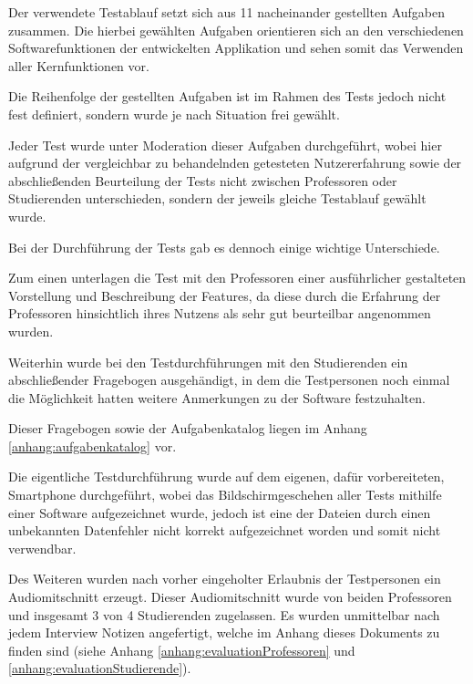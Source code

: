 \documentclass[bibliography=totoc,listof=totoc,BCOR=5mm,DIV=12,oneside]{scrbook}
\begin{document}
{\par \bigskip Der verwendete Testablauf setzt sich aus 11 nacheinander gestellten Aufgaben zusammen. Die hierbei gewählten Aufgaben orientieren sich an den verschiedenen Softwarefunktionen der entwickelten Applikation und sehen somit das Verwenden aller Kernfunktionen vor.
\par Die Reihenfolge der gestellten Aufgaben ist im Rahmen des Tests jedoch nicht fest definiert, sondern wurde je nach Situation frei gewählt.

\par \bigskip Jeder Test wurde unter Moderation dieser Aufgaben durchgeführt, wobei hier aufgrund der vergleichbar zu behandelnden getesteten Nutzererfahrung sowie der abschließenden Beurteilung der Tests nicht zwischen Professoren oder Studierenden unterschieden, sondern der jeweils gleiche Testablauf gewählt wurde.

\par \bigskip Bei der Durchführung der Tests gab es dennoch einige wichtige Unterschiede. 
\par Zum einen unterlagen die Test mit den Professoren einer ausführlicher gestalteten Vorstellung und Beschreibung der Features, da diese durch die Erfahrung der Professoren hinsichtlich ihres Nutzens als sehr gut beurteilbar angenommen wurden.
\par Weiterhin wurde bei den Testdurchführungen mit den Studierenden ein abschließender Fragebogen ausgehändigt, in dem die Testpersonen noch einmal die Möglichkeit hatten weitere Anmerkungen zu der Software festzuhalten. 

\par \bigskip Dieser Fragebogen sowie der Aufgabenkatalog liegen im Anhang \ref{anhang:aufgabenkatalog} vor.

\par \bigskip Die eigentliche Testdurchführung wurde auf dem eigenen, dafür vorbereiteten, Smartphone durchgeführt, wobei das Bildschirmgeschehen aller Tests mithilfe einer Software aufgezeichnet wurde, jedoch ist eine der Dateien durch einen unbekannten Datenfehler nicht korrekt aufgezeichnet worden und somit nicht verwendbar.

\par Des Weiteren wurden nach vorher eingeholter Erlaubnis der Testpersonen ein Audiomitschnitt erzeugt. Dieser Audiomitschnitt wurde von beiden Professoren und insgesamt 3 von 4 Studierenden zugelassen. Es wurden unmittelbar nach jedem Interview Notizen angefertigt, welche im Anhang dieses Dokuments zu finden sind (siehe Anhang \ref{anhang:evaluationProfessoren} und \ref{anhang:evaluationStudierende}).


}
\end{document}
